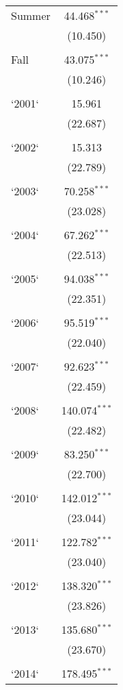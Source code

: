 \begin{table}[!htbp]
\begin{tabular}{@{\extracolsep{5pt}}lc}
 Summer & 44.468$^{***}$ \\ 
  & (10.450) \\ 
  & \\ 
 Fall & 43.075$^{***}$ \\ 
  & (10.246) \\ 
  & \\ 
 `2001` & 15.961 \\ 
  & (22.687) \\ 
  & \\ 
 `2002` & 15.313 \\ 
  & (22.789) \\ 
  & \\ 
 `2003` & 70.258$^{***}$ \\ 
  & (23.028) \\ 
  & \\ 
 `2004` & 67.262$^{***}$ \\ 
  & (22.513) \\ 
  & \\ 
 `2005` & 94.038$^{***}$ \\ 
  & (22.351) \\ 
  & \\ 
 `2006` & 95.519$^{***}$ \\ 
  & (22.040) \\ 
  & \\ 
 `2007` & 92.623$^{***}$ \\ 
  & (22.459) \\ 
  & \\ 
 `2008` & 140.074$^{***}$ \\ 
  & (22.482) \\ 
  & \\ 
 `2009` & 83.250$^{***}$ \\ 
  & (22.700) \\ 
  & \\ 
 `2010` & 142.012$^{***}$ \\ 
  & (23.044) \\ 
  & \\ 
 `2011` & 122.782$^{***}$ \\ 
  & (23.040) \\ 
  & \\ 
 `2012` & 138.320$^{***}$ \\ 
  & (23.826) \\ 
  & \\ 
 `2013` & 135.680$^{***}$ \\ 
  & (23.670) \\ 
  & \\ 
 `2014` & 178.495$^{***}$ \\ 

\end{tabular}
\end{table}

